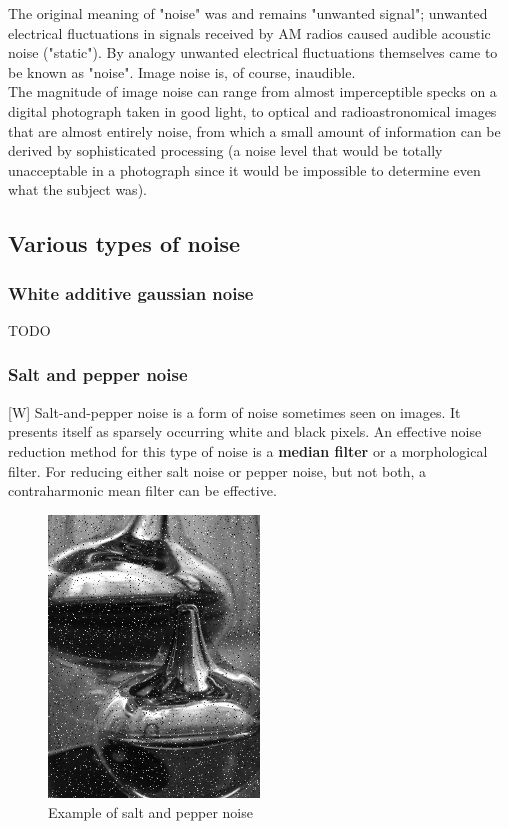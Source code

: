 \documentclass[12pt]{article}
\begin{document}
	The original meaning of "noise" was and remains "unwanted signal"; unwanted electrical
	fluctuations in signals received by AM radios caused audible acoustic noise ("static").
	By analogy unwanted electrical fluctuations themselves came to be known as "noise". 
	Image noise is, of course, inaudible.\\

	The magnitude of image noise can range from almost imperceptible specks on a digital 
	photograph taken in good light, to optical and radioastronomical images that are almost 
	entirely noise, from which a small amount of information can be derived by sophisticated 
	processing (a noise level that would be totally unacceptable in a photograph since it 
	would be impossible to determine even what the subject was).
	
	\subsection{Various types of noise}
	
	\subsubsection{White additive gaussian noise}
	TODO	
	
	\subsubsection{Salt and pepper noise}
	[W] Salt-and-pepper noise is a form of noise sometimes seen on images. It presents itself as 
	sparsely occurring white and black pixels. An effective noise reduction method for this 
	type of noise is a \textbf{median filter} or a morphological filter. For reducing either salt 
	noise or pepper noise, but not both, a contraharmonic mean filter can be effective.
	\begin{figure}[h!]
		\centering
		\includegraphics[width=0.5\textwidth]{img/Noise_salt_and_pepper.png}
		\caption{Example of salt and pepper noise}		
		\label{fig:salt_and_pepper}
	\end{figure}
	
\end{document}
